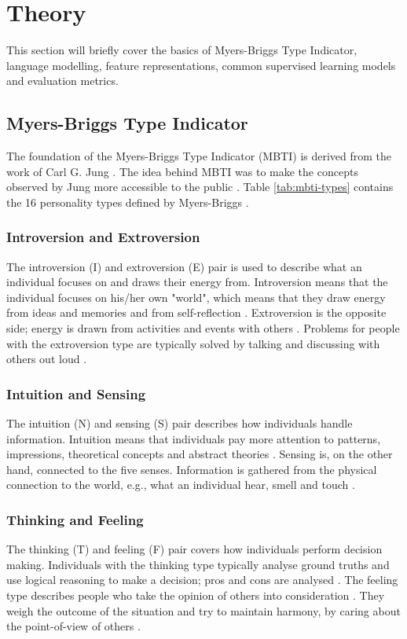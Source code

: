 \section{Theory} \label{sec:theory}

This section will briefly cover the basics of Myers-Briggs Type Indicator, language modelling, feature representations, common supervised learning models and evaluation metrics.

\subsection{Myers-Briggs Type Indicator}
The foundation of the Myers-Briggs Type Indicator (MBTI) is derived from the work of Carl G. Jung \cite{jung2014psychological}.
The idea behind MBTI was to make the concepts observed by Jung more accessible to the public \cite{mbti}.
Table \ref{tab:mbti-types} contains the 16 personality types defined by Myers-Briggs \cite{mbti}.

\subsubsection{Introversion and Extroversion}
The introversion (I) and extroversion (E) pair is used to describe what an individual focuses on and draws their energy from.
Introversion means that the individual focuses on his/her own "world", which means that they draw energy from ideas and memories and from self-reflection \cite{mbti-IE}.
Extroversion is the opposite side; energy is drawn from activities and events with others \cite{mbti-IE}.
Problems for people with the extroversion type are typically solved by talking and discussing with others out loud \cite{mbti-IE}.

\subsubsection{Intuition and Sensing}
The intuition (N) and sensing (S) pair describes how individuals handle information.
Intuition means that individuals pay more attention to patterns, impressions, theoretical concepts and abstract theories \cite{mbti-NS}.
Sensing is, on the other hand, connected to the five senses.
Information is gathered from the physical connection to the world, e.g., what an individual hear, smell and touch \cite{mbti-NS}.

\subsubsection{Thinking and Feeling}
The thinking (T) and feeling (F) pair covers how individuals perform decision making.
Individuals with the thinking type typically analyse ground truths and use logical reasoning to make a decision; pros and cons are analysed \cite{mbti-TF}.
The feeling type describes people who take the opinion of others into consideration \cite{mbti-TF}.
They weigh the outcome of the situation and try to maintain harmony, by caring about the point-of-view of others \cite{mbti-TF}.

